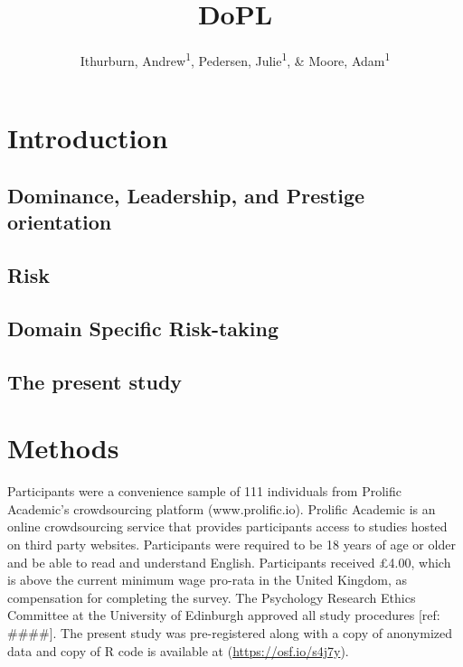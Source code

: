 \documentclass[
  english,
  man]{apa6}
\title{DoPL}
\author{Ithurburn, Andrew\textsuperscript{1}, Pedersen, Julie\textsuperscript{1}, \& Moore, Adam\textsuperscript{1}}
\date{}
\affiliation{\vspace{0.5cm}\textsuperscript{1} The University of Edinburgh}
\begin{document}
\maketitle

\hypertarget{introduction}{%
\section{Introduction}\label{introduction}}

\hypertarget{dominance-leadership-and-prestige-orientation}{%
\subsection{Dominance, Leadership, and Prestige orientation}\label{dominance-leadership-and-prestige-orientation}}

\hypertarget{risk}{%
\subsection{Risk}\label{risk}}

\hypertarget{domain-specific-risk-taking}{%
\subsection{Domain Specific Risk-taking}\label{domain-specific-risk-taking}}

\hypertarget{the-present-study}{%
\subsection{The present study}\label{the-present-study}}

\hypertarget{methods}{%
\section{Methods}\label{methods}}

Participants were a convenience sample of 111 individuals from Prolific Academic's crowdsourcing platform (www.prolific.io). Prolific Academic is an online crowdsourcing service that provides participants access to studies hosted on third party websites. Participants were required to be 18 years of age or older and be able to read and understand English. Participants received £4.00, which is above the current minimum wage pro-rata in the United Kingdom, as compensation for completing the survey. The Psychology Research Ethics Committee at the University of Edinburgh approved all study procedures {[}ref: \#\#\#\#{]}. The present study was pre-registered along with a copy of anonymized data and copy of R code is available at (\url{https://osf.io/s4j7y}).
\end{document}
